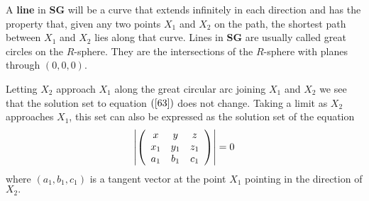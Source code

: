 \documentclass{ximera}
\begin{document}
\begin{definition}
A \textbf{line} in \textbf{SG} will be a curve that extends infinitely in each
direction and has the property that, given any two points $X_{1}$ and $X_{2}$
on the path, the shortest path between $X_{1}$ and $X_{2}$ lies along that
curve. Lines in \textbf{SG} are usually called great circles on the
$R$-sphere. They are the intersections of the $R$-sphere with planes through
$\left(  0,0,0\right)  $.
\end{definition}

Letting $X_{2}$ approach $X_{1}$ along the great circular arc joining $X_{1}$
and $X_{2}$ we see that the solution set to equation $\left(  \ref{63}\right)
$ does not change. Taking a limit as $X_{2}$ approaches $X_{1}$, this set can
also be expressed as the solution set of the equation%
\[
\left\vert \left(
\begin{array}
[c]{ccc}%
x & y & z\\
x_{1} & y_{1} & z_{1}\\
a_{1} & b_{1} & c_{1}%
\end{array}
\right)  \right\vert =0
\]
where $\left(  a_{1},b_{1},c_{1}\right)  $ is a tangent vector at the point
$X_{1}$ pointing in the direction of $X_{2}.$
\end{document}
